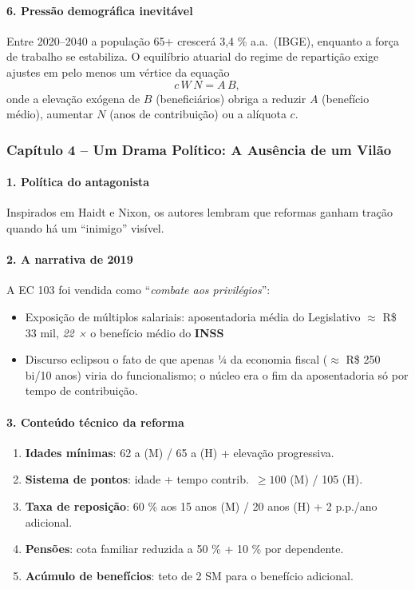 \documentclass[a4paper,12pt]{article}[abntex2]
\begin{document}
\paragraph{6. Pressão demográfica inevitável}  
Entre 2020–2040 a população 65+ crescerá 3,4 \% a.a.\ (IBGE), enquanto a força de trabalho se estabiliza. O equilíbrio atuarial do regime de repartição exige ajustes em pelo menos um vértice da equação
\[
c\,W\,N = A\,B,
\]
onde a elevação exógena de $B$ (beneficiários) obriga a reduzir $A$ (benefício médio), aumentar $N$ (anos de contribuição) ou a alíquota $c$.

\subsubsection{\textbf{Capítulo 4 – Um Drama Político: A Ausência de um Vilão}}

\paragraph{1. Política do antagonista}  
Inspirados em Haidt e Nixon, os autores lembram que reformas ganham tração quando há um “inimigo” visível.

\paragraph{2. A narrativa de 2019}  
A EC 103 foi vendida como “\emph{combate aos privilégios}”:  
\begin{itemize}
  \item Exposição de múltiplos salariais: aposentadoria média do Legislativo \(\approx\) R\$ 33 mil, \emph{22 ×} o benefício médio do \textbf{INSS}
  \item Discurso eclipsou o fato de que apenas ¼ da economia fiscal (\(\approx\) R\$ 250 bi/10 anos) viria do funcionalismo; o núcleo era o fim da aposentadoria só por tempo de contribuição.
\end{itemize}

\paragraph{3. Conteúdo técnico da reforma}
\begin{enumerate}
  \item \textbf{Idades mínimas}: 62 a (M) / 65 a (H) + elevação progressiva.  
  \item \textbf{Sistema de pontos}: idade + tempo contrib.\ $\ge 100$ (M) / 105 (H).  
  \item \textbf{Taxa de reposição}: 60 \% aos 15 anos (M) / 20 anos (H) + 2 p.p./ano adicional.  
  \item \textbf{Pensões}: cota familiar reduzida a 50 \% + 10 \% por dependente.  
  \item \textbf{Acúmulo de benefícios}: teto de 2 SM para o benefício adicional.
\end{enumerate}
\end{document}

